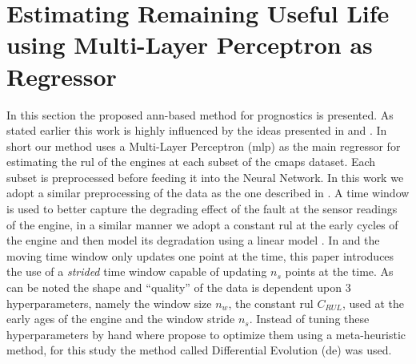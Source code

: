 \section{Estimating Remaining Useful Life using Multi-Layer Perceptron as Regressor}
\label{sec:method}

In this section the proposed \gls{ann}-based method for prognostics is presented. As stated earlier this work is highly influenced by the ideas presented in \cite{Lim2016} and \cite{Li2017}. In short our method uses a Multi-Layer Perceptron (\gls{mlp}) as the main regressor for estimating the \gls{rul} of the engines at each subset of the \gls{cmaps} dataset. Each subset is preprocessed before feeding it into the Neural Network. In this work we adopt a similar preprocessing of the data as the one described in \cite{Lim2016}. A time window is used to better capture the degrading effect of the fault at the sensor readings of the engine, in a similar manner we adopt a constant \gls{rul} at the early cycles of the engine and then model its degradation using a linear model \cite{Li2017}. In \cite{Li2017} and \cite{Lim2016} the moving time window only updates one point at the time,  this paper introduces the use of a \textit{strided} time window capable of updating $n_s$ points at the time. As can be noted the shape and ``quality'' of the data is dependent upon 3 hyperparameters, namely the window size $n_w$, the constant \gls{rul} $C_{RUL}$, used at the early ages of the engine and the window stride $n_s$. Instead of tuning these hyperparameters by hand where propose to optimize them using a meta-heuristic method, for this study the method called Differential Evolution (\gls{de}) was used.